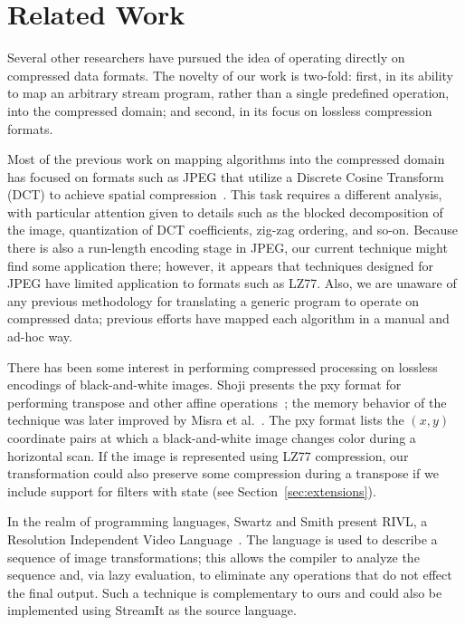 \section{Related Work}
\label{sec:related}

Several other researchers have pursued the idea of operating directly
on compressed data formats.  The novelty of our work is two-fold:
first, in its ability to map an arbitrary stream program, rather than
a single predefined operation, into the compressed domain; and second,
in its focus on lossless compression formats.

Most of the previous work on mapping algorithms into the compressed
domain has focused on formats such as JPEG that utilize a Discrete
Cosine Transform (DCT) to achieve spatial
compression~\cite{smith98,dorai00,dugad01,feng03,mukherjee02,nang00,shen96,shen96b,shen98,smith96b,vasudev98}.
This task requires a different analysis, with particular attention
given to details such as the blocked decomposition of the image,
quantization of DCT coefficients, zig-zag ordering, and so-on.
Because there is also a run-length encoding stage in JPEG, our current
technique might find some application there; however, it appears that
techniques designed for JPEG have limited application to formats such
as LZ77.  Also, we are unaware of any previous methodology for
translating a generic program to operate on compressed data; previous
efforts have mapped each algorithm in a manual and ad-hoc way.

There has been some interest in performing compressed processing on
lossless encodings of black-and-white images.  Shoji presents the pxy
format for performing transpose and other affine
operations~\cite{shoji95}; the memory behavior of the technique was
later improved by Misra et al.~\cite{misra99}.  
The pxy format lists the $(x,y)$ coordinate pairs at which a
black-and-white image changes color during a horizontal scan.  If the
image is represented using LZ77 compression, our transformation could
also preserve some compression during a transpose if we include
support for filters with state (see Section~\ref{sec:extensions}).

In the realm of programming languages, Swartz and Smith present RIVL,
a Resolution Independent Video Language~\cite{swartz95}.  The language
is used to describe a sequence of image transformations; this allows
the compiler to analyze the sequence and, via lazy evaluation, to
eliminate any operations that do not effect the final output.  Such a
technique is complementary to ours and could also be implemented using
StreamIt as the source language.
